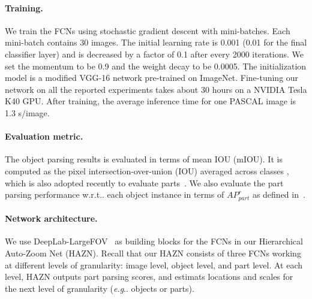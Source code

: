 \documentclass[runningheads]{llncs}
\makeatletter
\DeclareRobustCommand\onedot{\futurelet\@let@token\@onedot}
\def\@onedot{\ifx\@let@token.\else.\null\fi\xspace}
\def\eg{\emph{e.g}\onedot} \def\Eg{\emph{E.g}\onedot}
\def\wrt{w.r.t\onedot} \def\dof{d.o.f\onedot}
\makeatother
\begin{document}
\paragraph{Training.} We train the FCNs using stochastic gradient descent with mini-batches. Each mini-batch contains
30 images. The initial learning rate is 0.001 (0.01 for the final classifier layer) and is decreased by a factor of 0.1 after every 2000 iterations. We set the momentum to be 0.9 and the weight decay to be 0.0005. The initialization model is a modified VGG-16 network pre-trained on ImageNet. Fine-tuning our network on all the reported experiments takes about 30 hours on a NVIDIA Tesla K40 GPU. After training, the average inference time for one PASCAL image is 1.3 s/image.

\paragraph{Evaluation metric.} The object parsing results is evaluated in terms of mean IOU (mIOU). It is computed as the pixel intersection-over-union (IOU) averaged across classes \cite{everingham2014pascal}, which is also adopted recently to evaluate parts~\cite{wang2015joint,chen2015attention}. We also evaluate the part parsing performance \wrt each object instance in terms of $AP^r_{part}$ as defined in~\cite{hariharan2014hypercolumns}.


\paragraph{Network architecture.} We use DeepLab-LargeFOV~\cite{chen2014semantic} as building blocks for the FCNs in our Hierarchical Auto-Zoom Net (HAZN). Recall that our HAZN consists of three FCNs working at different levels of granularity: image level, object level, and part level. At each level, HAZN outputs part parsing scores, and estimats locations and scales for the next level of granularity (\eg objects or parts).


\vspace{-0.7\baselineskip}
\end{document}
